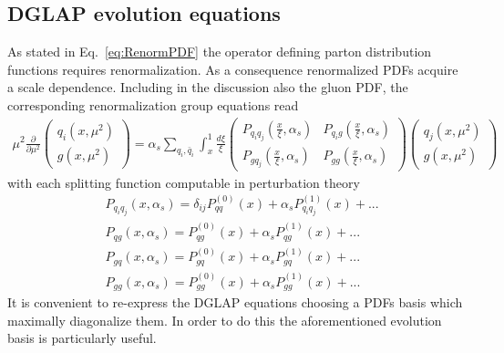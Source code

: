 \subsection{DGLAP evolution equations}
\label{sec:DGLAP}
As stated in Eq.~\ref{eq:RenormPDF} the operator defining parton distribution functions requires
renormalization. As a consequence renormalized PDFs acquire a scale dependence.
Including in the discussion also the gluon PDF, the corresponding renormalization group equations read
\begin{align}
    \mu^2\frac{\partial}{\partial\mu^2}
    \begin{pmatrix}
        q_i\left(x,\mu^2\right) \\  
        g\left(x,\mu^2\right)
    \end{pmatrix}
    =
    \alpha_s\sum_{q_i,\bar{q}_i}\int_x^1 \frac{d\xi}{\xi} 
    \begin{pmatrix}
        P_{q_i q_j}\left(\frac{x}{\xi},\alpha_s\right) & P_{q_i g}\left(\frac{x}{\xi},\alpha_s\right) \\
        P_{g q_j}\left(\frac{x}{\xi},\alpha_s\right)   & P_{g g}\left(\frac{x}{\xi},\alpha_s\right) 
    \end{pmatrix}
    \begin{pmatrix}
        q_j\left(x,\mu^2\right) \\  
        g\left(x,\mu^2\right)
    \end{pmatrix}
\end{align}
with each splitting function computable in perturbation theory
\begin{equation}
    \begin{split}
    &P_{q_i q_j}\left(x,\alpha_s\right) = \delta_{ij}P^{(0)}_{qq}\left(x\right) 
    + \alpha_s P^{(1)}_{q_i q_j}\left(x\right) + ... \\
    &P_{q g}\left(x,\alpha_s\right) = P^{(0)}_{qg}\left(x\right) 
    + \alpha_s P^{(1)}_{q g}\left(x\right) + ... \\
    &P_{g q}\left(x,\alpha_s\right) = P^{(0)}_{gq}\left(x\right) 
    + \alpha_s P^{(1)}_{gq}\left(x\right) + ... \\
    &P_{g g}\left(x,\alpha_s\right) = P^{(0)}_{gg}\left(x\right) 
    + \alpha_s P^{(1)}_{gg}\left(x\right) + ... 
    \end{split}
\end{equation}
It is convenient to re-express the DGLAP equations choosing a PDFs basis which maximally diagonalize them. 
In order to do this the aforementioned evolution basis is particularly useful.
